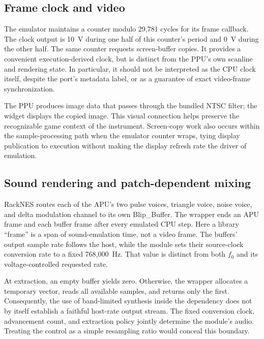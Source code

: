 \documentclass[10pt,letterpaper,twocolumn]{article}
\begin{document}
\subsection{Frame clock and video}
The emulator maintains a counter modulo 29,781 cycles for its frame callback.
The clock output is 10~V during one half of this counter's period and 0~V
during the other half. The same counter requests screen-buffer copies. It
provides a convenient execution-derived clock, but is distinct from the PPU's
own scanline and rendering state. In particular, it should not be interpreted
as the CPU clock itself, despite the port's metadata label, or as a guarantee
of exact video-frame synchronization.

The PPU produces image data that passes through the bundled NTSC filter;
the widget displays the copied image. This visual connection helps preserve
the recognizable game context of the instrument. Screen-copy work also occurs
within the sample-processing path when the emulator counter wraps, tying
display publication to execution without making the display refresh rate the
driver of emulation.

\subsection{Sound rendering and patch-dependent mixing}
RackNES routes each of the APU's two pulse voices, triangle voice, noise voice,
and delta modulation channel to its own Blip\_Buffer. The wrapper ends an
APU frame and each buffer frame after every emulated CPU step. Here a library
``frame'' is a span of sound-emulation time, not a video frame. The buffers'
output sample rate follows the host, while the module sets their source-clock
conversion rate to a fixed 768,000~Hz. That value is distinct from both $f_0$
and its voltage-controlled requested rate.

At extraction, an empty buffer yields zero. Otherwise, the wrapper allocates
a temporary vector, reads all available samples, and returns only the first.
Consequently, the use of band-limited synthesis inside the dependency does not
by itself establish a faithful host-rate output stream. The fixed conversion
clock, advancement count, and extraction policy jointly determine the module's
audio. Treating the control as a simple resampling ratio would conceal this
boundary.
\end{document}
